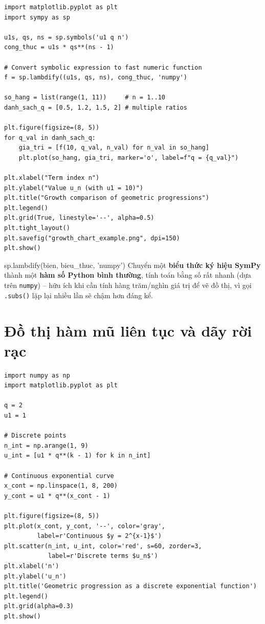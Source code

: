 \documentclass[12pt,a4paper]{report}
\begin{document}
\begin{lstlisting}[caption={Vẽ đồ thị so sánh các CSN với q khác nhau}]
import matplotlib.pyplot as plt
import sympy as sp

u1s, qs, ns = sp.symbols('u1 q n')
cong_thuc = u1s * qs**(ns - 1)

# Convert symbolic expression to fast numeric function
f = sp.lambdify((u1s, qs, ns), cong_thuc, 'numpy')

so_hang = list(range(1, 11))     # n = 1..10
danh_sach_q = [0.5, 1.2, 1.5, 2] # multiple ratios

plt.figure(figsize=(8, 5))
for q_val in danh_sach_q:
    gia_tri = [f(10, q_val, n_val) for n_val in so_hang]
    plt.plot(so_hang, gia_tri, marker='o', label=f"q = {q_val}")

plt.xlabel("Term index n")
plt.ylabel("Value u_n (with u1 = 10)")
plt.title("Growth comparison of geometric progressions")
plt.legend()
plt.grid(True, linestyle='--', alpha=0.5)
plt.tight_layout()
plt.savefig("growth_chart_example.png", dpi=150)
plt.show()
\end{lstlisting}

\begin{syntaxbox}{sp.lambdify(bien, bieu\_thuc, 'numpy')}
Chuyển một \textbf{biểu thức ký hiệu SymPy} thành một \textbf{hàm số
Python bình thường}, tính toán bằng số rất nhanh (dựa trên
\texttt{numpy}) -- hữu ích khi cần tính hàng trăm/nghìn giá trị để vẽ
đồ thị, vì gọi \texttt{.subs()} lặp lại nhiều lần sẽ chậm hơn đáng kể.
\end{syntaxbox}

\section{Đồ thị hàm mũ liên tục và dãy rời rạc}

\begin{lstlisting}[caption={So sánh dãy rời rạc và hàm mũ liên tục}]
import numpy as np
import matplotlib.pyplot as plt

q = 2
u1 = 1

# Discrete points
n_int = np.arange(1, 9)
u_int = [u1 * q**(k - 1) for k in n_int]

# Continuous exponential curve
x_cont = np.linspace(1, 8, 200)
y_cont = u1 * q**(x_cont - 1)

plt.figure(figsize=(8, 5))
plt.plot(x_cont, y_cont, '--', color='gray',
         label=r'Continuous $y = 2^{x-1}$')
plt.scatter(n_int, u_int, color='red', s=60, zorder=3,
            label=r'Discrete terms $u_n$')
plt.xlabel('n')
plt.ylabel('u_n')
plt.title('Geometric progression as a discrete exponential function')
plt.legend()
plt.grid(alpha=0.3)
plt.show()
\end{lstlisting}
\end{document}
